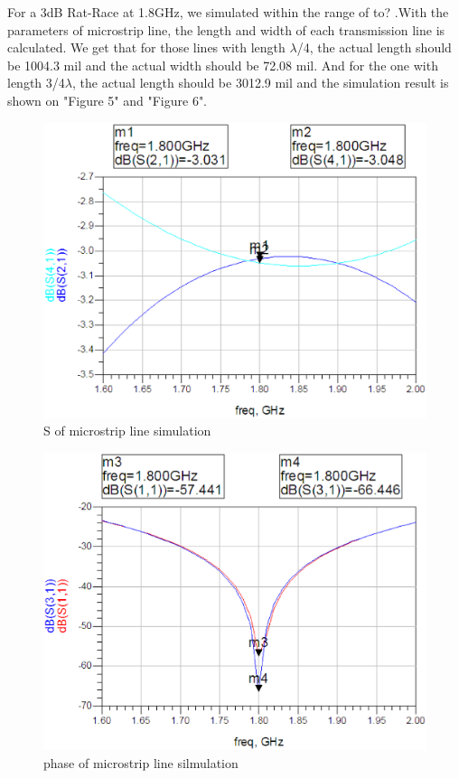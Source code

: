 \documentclass[11pt,a4paper]{report}
\begin{document}
For a 3dB Rat-Race at 1.8GHz, we simulated within the range of to? .With the parameters of microstrip line, the length and width of each transmission line is calculated. We get that for those lines with length \(\lambda\)/4, the actual length should be 1004.3 mil and the actual width should be 72.08 mil. And for the one with length 3/4\(\lambda\), the actual length should be 3012.9 mil and the simulation result is shown on "Figure 5" and "Figure 6". \\

\begin{figure}
\centering
\includegraphics[width=\textwidth]{simul1.eps}
\caption{S of microstrip line simulation}
\end{figure}

\begin{figure}
\centering
\includegraphics[width=\textwidth]{simul2.eps}
\caption{phase of microstrip line silmulation}
\end{figure}
\end{document}
